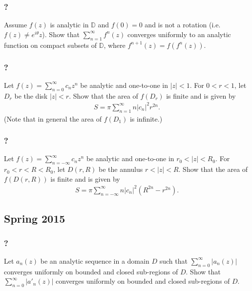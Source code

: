 \hypertarget{section-149}{%
\subsubsection{?}\label{section-149}}

Assume \(f(z)\) is analytic in \({\mathbb D}\) and \(f(0)=0\) and is not
a rotation (i.e.~\(f(z) \neq e^{i \theta} z\)). Show that
\(\displaystyle \sum_{n=1}^\infty f^{n}(z)\) converges uniformly to an
analytic function on compact subsets of \({\mathbb D}\), where
\(f^{n+1}(z) = f(f^{n}(z))\).

\hypertarget{section-150}{%
\subsubsection{?}\label{section-150}}

Let \(f(z) = \sum_{n=0}^\infty c_n z^n\) be analytic and one-to-one in
\(|z| < 1\). For \(0<r<1\), let \(D_r\) be the disk \(|z|<r\). Show that
the area of \(f(D_r)\) is finite and is given by
\begin{align*}S = \pi \sum_{n=1}^\infty n |c_n|^2 r^{2n}.\end{align*}
(Note that in general the area of \(f(D_1)\) is infinite.)

\hypertarget{section-151}{%
\subsubsection{?}\label{section-151}}

Let \(f(z) = \sum_{n= -\infty}^\infty c_n z^n\) be analytic and
one-to-one in \(r_0< |z| < R_0\). For \(r_0<r<R<R_0\), let \(D(r,R)\) be
the annulus \(r<|z|<R\). Show that the area of \(f(D(r,R))\) is finite
and is given by
\begin{align*}S = \pi \sum_{n=- \infty}^\infty n |c_n|^2 (R^{2n} - r^{2n}).\end{align*}

\hypertarget{spring-2015}{%
\subsection{Spring 2015}\label{spring-2015}}

\hypertarget{section-152}{%
\subsubsection{?}\label{section-152}}

Let \(a_n(z)\) be an analytic sequence in a domain \(D\) such that
\(\displaystyle \sum_{n=0}^\infty |a_n(z)|\) converges uniformly on
bounded and closed sub-regions of \(D\). Show that
\(\displaystyle \sum_{n=0}^\infty |a'_n(z)|\) converges uniformly on
bounded and closed sub-regions of \(D\).

